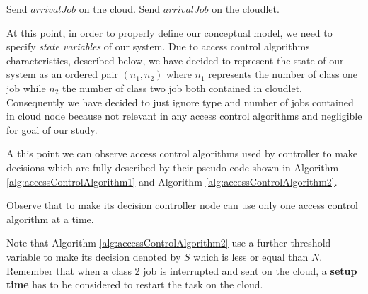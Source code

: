\documentclass[10pt,a4paper]{article}
\begin{document}
\begin{algorithm}

\caption{}\label{alg:accessControlAlgorithm1}

\begin{algorithmic}[1]


	\State Send $\textit{arrivalJob}$ on the cloud.
\Else 	
 	\State Send $\textit{arrivalJob}$ on the cloudlet.
\EndIf

\EndFunction

\end{algorithmic}
\end{algorithm}

At this point, in order to properly define our conceptual model, we need to specify \textit{state variables} of our system. 
Due to access control algorithms characteristics, described below, we have decided to represent the state of our system as an ordered pair $(n_1, n_2)$ where $n_1$ represents the number of class one job while $n_2$ the number of class two job both contained in cloudlet. Consequently we have decided to just ignore type and number of jobs contained in cloud node because not relevant in any access control algorithms and negligible for goal of our study. 

A this point we can observe access control algorithms used by controller to make decisions which are fully described by their pseudo-code shown in Algorithm \ref{alg:accessControlAlgorithm1} and Algorithm \ref{alg:accessControlAlgorithm2}. 

Observe that to make its decision controller node can use only one access control algorithm at a time. 

Note that Algorithm \ref{alg:accessControlAlgorithm2} use a further threshold variable to make its decision denoted by $S$ which is less or equal than $N$. Remember that when a class 2 job is interrupted and sent on the cloud, a \textbf{ setup time} has to be considered to restart the task on the cloud. 
\end{document}
